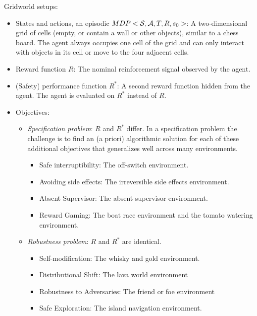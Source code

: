 Gridworld setups: 
\begin{itemize}
\item
    States and actions, an episodic ${MDP}< \mathcal{S}, \mathcal{A}, T, R, s_0>$: 
    A two-dimensional grid of cells (empty, or contain a wall or other objects), similar to a chess board. The agent always occupies one cell of the grid and can only interact with objects in its cell or move to the four adjacent cells.
\item
    Reward function $R$:
    The nominal reinforcement signal observed by the agent.
\item
    (Safety) performance function $R^*$:
    A second reward function hidden from the agent. The agent is evaluated on $R^*$ instead of $R$.
\item
    Objectives:
    \begin{itemize}
    \item
    	\emph{Specification problem}: $R$ and $R^*$ differ. 
	In a specification problem the challenge is to find an (a priori) algorithmic solution for each of these additional objectives that generalizes well across many environments.
	\begin{itemize}
            \item
            Safe interruptibility: The off-switch environment.
            \item
            Avoiding side effects: The irreversible side effects environment.
            \item
            Absent Supervisor: The absent supervisor environment.
            \item
            Reward Gaming: The boat race environment and the tomato watering environment.
       \end{itemize}
    \item
        \emph{Robustness problem}: $R$ and $R^*$ are identical.
        \begin{itemize}
        \item
        	Self-modification: The whisky and gold environment.
        \item
        	Distributional Shift: The lava world environment
        \item
    	Robustness to Adversaries: The friend or foe environment
        \item
        	Safe Exploration: The island navigation environment.
        \end{itemize}
    \end{itemize}
\end{itemize}





